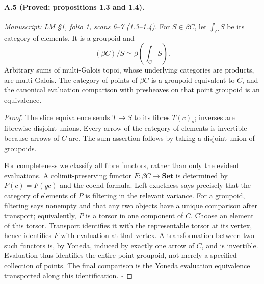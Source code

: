 \paragraph{A.5 (Proved; propositions 1.3 and 1.4).}
\textit{Manuscript: LM \S1, folio 1, scans 6--7 (1.3--1.4).}
For $S\in\beta C$, let $\int_C S$ be its category of elements. It is a groupoid and
\[
 (\beta C)/S\simeq\beta\!\left(\int_C S\right).
\]
Arbitrary sums of multi-Galois topoi, whose underlying categories are products, are multi-Galois. The category of points of $\beta C$ is a groupoid equivalent to $C$, and the canonical evaluation comparison with presheaves on that point groupoid is an equivalence.
\begin{proof}
The slice equivalence sends $T\to S$ to its fibres $T(c)_s$; inverses are fibrewise disjoint unions. Every arrow of the category of elements is invertible because arrows of $C$ are. The sum assertion follows by taking a disjoint union of groupoids.

For completeness we classify all fibre functors, rather than only the evident evaluations. A colimit-preserving functor $F:\beta C\to\mathbf{Set}$ is determined by $P(c)=F(yc)$ and the coend formula. Left exactness says precisely that the category of elements of $P$ is filtering in the relevant variance. For a groupoid, filtering says nonempty and that any two objects have a unique comparison after transport; equivalently, $P$ is a torsor in one component of $C$. Choose an element of this torsor. Transport identifies it with the representable torsor at its vertex, hence identifies $F$ with evaluation at that vertex. A transformation between two such functors is, by Yoneda, induced by exactly one arrow of $C$, and is invertible. Evaluation thus identifies the entire point groupoid, not merely a specified collection of points. The final comparison is the Yoneda evaluation equivalence transported along this identification. \hfill$\square$
\end{proof}

